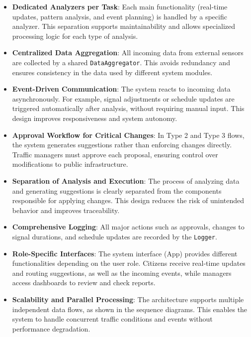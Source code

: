 \begin{itemize}
    \item \textbf{Dedicated Analyzers per Task}: Each main functionality (real-time updates, pattern analysis, and event planning) is handled by a specific analyzer. This separation supports maintainability and allows specialized processing logic for each type of analysis.

    \item \textbf{Centralized Data Aggregation}: All incoming data from external sensors are collected by a shared \texttt{DataAggregator}. This avoids redundancy and ensures consistency in the data used by different system modules.

    \item \textbf{Event-Driven Communication}: The system reacts to incoming data asynchronously. For example, signal adjustments or schedule updates are triggered automatically after analysis, without requiring manual input. This design improves responsiveness and system autonomy.

    \item \textbf{Approval Workflow for Critical Changes}: In Type 2 and Type 3 flows, the system generates suggestions rather than enforcing changes directly. Traffic managers must approve each proposal, ensuring control over modifications to public infrastructure.

    \item \textbf{Separation of Analysis and Execution}: The process of analyzing data and generating suggestions is clearly separated from the components responsible for applying changes. This design reduces the risk of unintended behavior and improves traceability.

    \item \textbf{Comprehensive Logging}: All major actions such as approvals, changes to signal durations, and schedule updates are recorded by the \texttt{Logger}.

    \item \textbf{Role-Specific Interfaces}: The system interface (App) provides different functionalities depending on the user role. Citizens receive real-time updates and routing suggestions, as well as the incoming events, while managers access dashboards to review and check reports.

    \item \textbf{Scalability and Parallel Processing}: The architecture supports multiple independent data flows, as shown in the sequence diagrams. This enables the system to handle concurrent traffic conditions and events without performance degradation.
\end{itemize}
